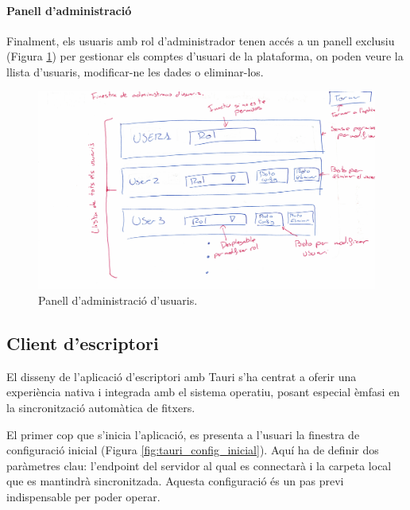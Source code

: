 \paragraph{Panell d'administració}
Finalment, els usuaris amb rol d'administrador tenen accés a un panell exclusiu (Figura \ref{fig:react-admin-usuaris}) per gestionar els comptes d'usuari de la plataforma, on poden veure la llista d'usuaris, modificar-ne les dades o eliminar-los.

\begin{figure}[H]
    \centering
    \includegraphics[width=\textwidth]{Figures/interficies/react-admin-usuaris.jpg}
    \caption{Panell d'administració d'usuaris.}
    \label{fig:react-admin-usuaris}
\end{figure}

\subsection{Client d'escriptori}
El disseny de l'aplicació d'escriptori amb Tauri s'ha centrat a oferir una experiència nativa i integrada amb el sistema operatiu, posant especial èmfasi en la sincronització automàtica de fitxers.

El primer cop que s'inicia l'aplicació, es presenta a l'usuari la finestra de configuració inicial (Figura \ref{fig:tauri_config_inicial}). Aquí ha de definir dos paràmetres clau: l'endpoint del servidor al qual es connectarà i la carpeta local que es mantindrà sincronitzada. Aquesta configuració és un pas previ indispensable per poder operar.


